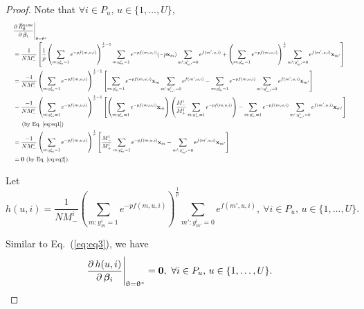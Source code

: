 \begin{proof}
Note that $\forall i \in P_u, \, u \in \{1,\dots,U\}$,
\begin{equation}
\label{eq:eq3}
\resizebox{\textwidth}{!}{$
\begin{aligned}
&\frac{\partial \, \widetilde R_{\uptheta}^{\textsc{rank}}} {\partial \, \betabm_i} \Bigg|_{\uptheta = \uptheta^*} \\
&= \frac{1}{N M_-^i} \left[
   \frac{1}{p} \left( \sum_{m: y_m^i = 1} e^{-p f(m, u, i)} \right)^{\frac{1}{p} - 1} 
   \sum_{m: y_m^i = 1} e^{-p f(m, u, i)} (-p \x_m) 
   \sum_{m': y_{m'}^i = 0} e^{f(m', u, i)} + 
   \left( \sum_{m: y_m^i = 1} e^{-p f(m, u, i)} \right)^\frac{1}{p}
   \sum_{m': y_{m'}^i = 0} e^{f(m', u, i)} \x_{m'} \right] \\
&= \frac{-1}{N M_-^i}
   \left( \sum_{m: y_m^i = 1} e^{-p f(m, u, i)} \right)^{\frac{1}{p} - 1} 
   \left[
   \sum_{m: y_m^i = 1} e^{-p f(m, u, i)} \x_m 
   \sum_{m': y_{m'}^i = 0} e^{f(m', u, i)} -
   \sum_{m: y_m^i = 1} e^{-p f(m, u, i)}
   \sum_{m': y_{m'}^i = 0} e^{f(m', u, i)} \x_{m'} \right] \\
&= \frac{-1}{N M_-^i}
   \left( \sum_{m: y_m^i = 1} e^{-p f(m, u, i)} \right)^{\frac{1}{p} - 1} 
   \left[
   \left( \sum_{m: y_m^i = 1} e^{-p f(m, u, i)} \x_m \right)
   \left( \frac{M_-^i}{M_+^i} \sum_{m: y_m^i = 1} e^{-p f(m, u, i)} \right) -
   \sum_{m: y_m^i = 1} e^{-p f(m, u, i)}
   \sum_{m': y_{m'}^i = 0} e^{f(m', u, i)} \x_{m'} \right] \\
&  \hspace{1.5em} (\text{by Eq.~\ref{eq:eq1}}) \\
&= \frac{-1}{N M_-^i}
   \left( \sum_{m: y_m^i = 1} e^{-p f(m, u, i)} \right)^\frac{1}{p}
   \left[
   \frac{M_-^i}{M_+^i}
   \sum_{m: y_m^i = 1} e^{-p f(m, u, i)} \x_m -
   \sum_{m': y_{m'}^i = 0} e^{f(m', u, i)} \x_{m'} \right] \\
&= \zero \ (\text{by Eq.~\ref{eq:eq2}}).
\end{aligned}
$}
\end{equation}

Let 
\begin{equation*}
h(u, i) 
= \frac{1}{N M_-^i} \left( \sum_{m: y_m^i = 1} e^{-p f(m, u, i)} \right)^\frac{1}{p} 
  \sum_{m': y_{m'}^i = 0} e^{f(m', u, i)},
\ \forall i \in P_u, \, u \in \{1,\dots,U\}.
\end{equation*}

Similar to Eq.~(\ref{eq:eq3}), we have
\begin{equation}
\label{eq:eq4}
\frac{\partial \, h(u, i)}{\partial \, {\bm{\beta}}_i} \Bigg|_{\uptheta = \uptheta^*} = \mathbf{0},
\ \forall i \in P_u, \, u \in \{1,\dots,U\}.
\end{equation}


\end{proof}
